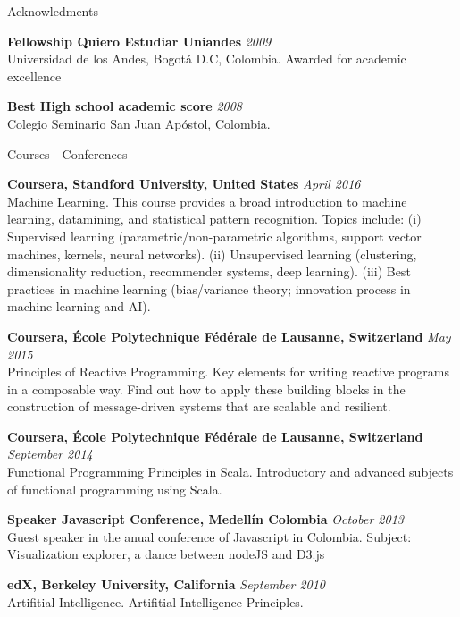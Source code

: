\documentclass[spanish]{resume}
\begin{document}
\begin{rSection}{Acknowledments}

{\bf Fellowship Quiero Estudiar Uniandes} \hfill {\em 2009} \\
Universidad de los Andes, Bogot\'a D.C, Colombia.
Awarded for academic excellence

{\bf Best High school academic score} \hfill {\em 2008} \\
Colegio Seminario San Juan Ap\'ostol, Colombia.

\end{rSection}


\begin{rSection}{Courses - Conferences}

{\bf Coursera, Standford University, United States} \hfill {\em April 2016} \\
Machine Learning.
This course provides a broad introduction to machine learning, datamining, and statistical pattern recognition. Topics include: (i) Supervised learning (parametric/non-parametric algorithms, support vector machines, kernels, neural networks). (ii) Unsupervised learning (clustering, dimensionality reduction, recommender systems, deep learning). (iii) Best practices in machine learning (bias/variance theory; innovation process in machine learning and AI).

{\bf Coursera, \'Ecole Polytechnique F\'ed\'erale de Lausanne, Switzerland} \hfill {\em May 2015} \\
Principles of Reactive Programming.
Key elements for writing reactive programs in a composable way. Find out how to apply these building blocks in the construction of message-driven systems that are scalable and resilient.

{\bf Coursera, \'Ecole Polytechnique F\'ed\'erale de Lausanne, Switzerland} \hfill {\em September 2014} \\
Functional Programming Principles in Scala.
Introductory and advanced subjects of functional programming using Scala.

{\bf Speaker Javascript Conference, Medell\'in Colombia} \hfill {\em October 2013} \\
Guest speaker in the anual conference of Javascript in Colombia.
Subject: Visualization explorer, a dance between nodeJS and D3.js

{\bf edX, Berkeley University, California} \hfill {\em September 2010} \\
Artifitial Intelligence.
Artifitial Intelligence Principles.

\end{rSection}
\end{document}
